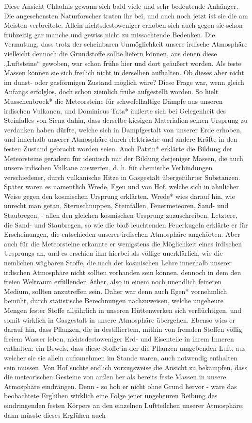 \documentclass[a4paper, 8pt, oneside, polutonikogreek, german]{article}
\begin{document}
Diese Ansicht Chladnis gewann sich bald viele und sehr bedeutende Anhänger. Die angesehensten Naturforscher traten ihr bei, und auch noch jetzt ist sie die am Meisten verbreitete. Allein nichtsdestoweniger erhoben sich auch gegen sie schon frühzeitig gar manche und gewiss nicht zu missachtende Bedenken. Die Vermutung, dass trotz der scheinbaren Unmöglichkeit unsere irdische Atmosphäre vielleicht dennoch die Grundstoffe sollte liefern können, aus denen diese „Luftsteine“ gewoben, war schon frühe hier und dort geäußert worden. Als feste Massen können sie sich freilich nicht in derselben aufhalten. Ob dieses aber nicht im dunst- oder gasförmigen Zustand möglich wäre? Diese Frage war, wenn gleich Anfangs erfolglos, doch schon ziemlich frühe aufgestellt worden. So hielt Musschenbroek* die Meteorsteine für schwefelhaltige Dämpfe aus unseren irdischen Vulkanen, und Dominicus Tata* äußerte sich bei Gelegenheit des Steinfalles von Siena dahin, dass derselbe kiesigen Materialien seinen Ursprung zu verdanken haben dürfte, welche sich in Dampfgestalt von unserer Erde erhoben, und innerhalb unserer Atmosphäre durch elektrische und andere Kräfte in den festen Zustand gebracht worden seien. Auch Patrin* erklärte die Bildung der Meteorsteine geradezu für identisch mit der Bildung derjeniger Massen, die auch unsere irdischen Vulkane auswerfen, d. h. für chemische Verbindungen verschiedener, durch vulkanische Hitze in Gasgestalt übergeführter Substanzen. Später waren es namentlich Wrede, Egen und von Hof, welche sich in ähnlicher Weise gegen den kosmischen Ursprung erklärten. Wrede* wies darauf hin, wie unrecht man getan, Sternschnuppen, Steinfällen, Feuermeteoren, Sand- und Staubregen, - allen den gleichen kosmischen Ursprung zuzuschreiben. Letztere, die Sand- und Staubregen, so wie die bloß leuchtenden Feuerkugeln erklärte er für Erscheinungen, die entschieden unserer irdischen Atmosphäre angehörten. Aber auch für die Meteorsteine erkannte er wenigstens die Möglichkeit eines irdischen Ursprungs an, und es erschien ihm hierbei als völlige unerklärlich, wie die nemlichen wägbaren Stoffe, die nach der kosmischen Lehre innerhalb unserer irdischen Atmosphäre nicht sollten vorhanden sein können, dennoch in dem den freien Weltraum erfüllenden Äther, also in einem noch unendlich feineren Medium, sollten anzutreffen sein. Daher war denn auch Egen* vornehmlich bemüht, durch statistische Berechnungen nachzuweisen, welche ungeheure Mengen fester Stoffe alljährlich in unseren Hüttenwerken sich verflüchtigen, und somit wirklich in Gasgestalt in unsere Atmosphäre übergehen. Ebenso wies er darauf hin, dass Pflanzen, die in destilliertem, mithin von fremden Stoffen völlig freiem Wasser leben, nichtsdestoweniger Erd- und Eisenteile in ihrem Inneren enthalten: ein Beweis, dass diese Stoffe in der die Pflanzen umgebenden Luft, aus welcher sie sie allein aufzunehmen im Stande waren, auch notwendig enthalten sein müssen. Von Hof suchte endlich vorzugsweise die Ansicht zu bekämpfen, dass die meteorischen Gesteine von außen her als bereits feste Massen in unsere Atmosphäre eindrängen. Denn - so hob er nicht ohne Grund hervor - wäre das beobachtete Erglühen wirklich eine Folge jener ungeheuren Reibung des eindringenden festen Körpers an den einzelnen Luftteilchen unserer Atmosphäre: dann müsste dieses Erglühen auch 
\end{document}
